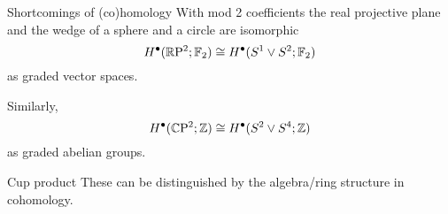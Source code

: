 \begin{frame}{Shortcomings of (co)homology}
	\pause With mod 2 coefficients the real projective plane and the wedge of a sphere and a circle are isomorphic
	\[
	H^\bullet(\mathbb{R} \mathrm{P}^2; {\mathbb{F}_2}) \cong H^\bullet(S^1 \vee S^2; {\mathbb{F}_2})
	\]
	as graded vector spaces.

	\bigskip\pause
	Similarly,
	\[
	H^\bullet(\mathbb{C} \mathrm{P}^2; \mathbb{Z}) \cong H^\bullet(S^2 \vee S^4; \mathbb{Z})
	\]
	as graded abelian groups.

	\bigskip\pause
	\begin{block}{Cup product}
		These can be distinguished by the algebra/ring structure in cohomology.
	\end{block}
\end{frame}